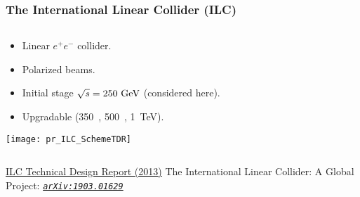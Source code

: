 \begin{frame}
    \frametitle{The International Linear Collider (ILC)}
    \begin{columns}[c,onlytextwidth]
    \begin{column}{0.60\textwidth}
        \begin{itemize}
            \item Linear $e^+e^-$ collider.
            \item Polarized beams.
            \item Initial stage $\sqrt{s} = 250~\text{G\text{e\kern-0.15ex V}}$ (considered here).
            \item Upgradable (350~\GeV, 500~\GeV, 1~TeV).
        \end{itemize}
        \texttt{[image: pr\_ILC\_SchemeTDR]}
    \end{column}
    \begin{column}{0.40\textwidth}
    \end{column}
    \end{columns}
    \vfill
    {\footnotesize
    \href{https://linearcollider.org/technical-design-report/}{ILC Technical Design Report (2013)}\newline
    The International Linear Collider: A Global Project:
    \href{https://arxiv.org/abs/1903.01629}{\emph{\texttt{arXiv:1903.01629}}}
    }
    \end{frame}
